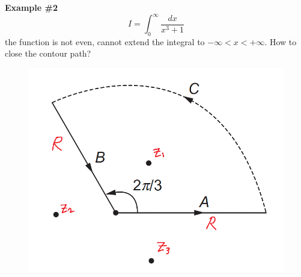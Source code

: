 \documentclass{article}
\begin{document}
\noindent
\textbf{Example \#2}
\begin{equation}
    I = \int_0^\infty \frac{dx}{x^3 + 1 } 
\end{equation}
the function is not even, cannot extend the integral to $-\infty < x < +\infty$. How to close the contour path?
\begin{figure}[h]
    \centering
    \includegraphics[width=0.4\linewidth]{fig42.png}
\end{figure}
\end{document}
